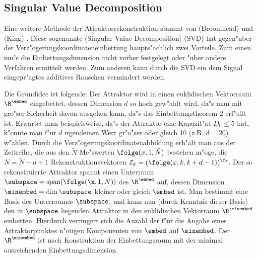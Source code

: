 \subsection{Singular Value Decomposition}
\label{chapsvd}
Eine weitere Methode der Attraktorrekonstruktion stammt von \autor(Broomhead) und
\autor(King) \cite{Broomhead-king}. Diese sogenannte \begriff(Singular Value
Decomposition) (SVD) hat gegen"uber der Ver\-z"ogerungskoordinateneinbettung haupts"achlich
zwei Vorteile. Zum einen mu"s die Einbettungsdimension nicht vorher festgelegt oder "uber
andere Verfahren ermittelt werden. Zum anderen kann durch die SVD ein dem Signal
eingepr"agtes additives Rauschen vermindert werden.


Die Grundidee ist folgende: Der Attraktor wird in einen euklidischen Vektorraum
$\R^\embed$ eingebettet, dessen Dimension $d$ so hoch gew"ahlt wird, da"s man mit gro"ser
Sicherheit davon ausgehen kann, da"s das Einbettungstheorem 2 erf"ullt ist. Erwartet man
beispielsweise, da"s der Attraktor eine Kapazit"at $D_0\leq5$ hat, k"onnte man f"ur $d$
irgendeinen Wert gr"o"ser oder gleich 10 (z.B. $d=20$) w"ahlen. Durch die
Verz"ogerungskoordinatenabbildung erh"alt man aus der Zeitreihe, die aus den $\tilde N$
Me"swerten $\folge(x,1,\tilde N)$ bestehen m"oge, die $N=\tilde N-d+1$
Rekonstruktionsvektoren $\vec x_k = (\folge(x,k,k+d-1))^\Tr$.  Der so rekonstruierte
Attraktor spannt einen Unterraum $\subspace=\mathop{\mathrm{span}}(\folge(\x,1,N))$ des
$\R^\embed$ auf, dessen Dimension $\minembed=\mathop{\mathrm{dim}}\subspace$ kleiner oder
gleich $\embed$ ist. Man bestimmt eine Basis des Unterraumes $\subspace$, und kann nun
(durch Kenntnis dieser Basis) den in $\subspace$ liegenden Attraktor in den euklidischen
Vektorraum $\R^\minembed$ einbetten. Hierdurch verringert sich die Anzahl der f"ur die
Angabe eines Attraktorpunktes n"otigen Komponenten von $\embed$ auf $\minembed$.  Der
$\R^\minembed$ ist nach Konstruktion der Einbettungsraum mit der minimal ausreichenden
Einbettungsdimension.


